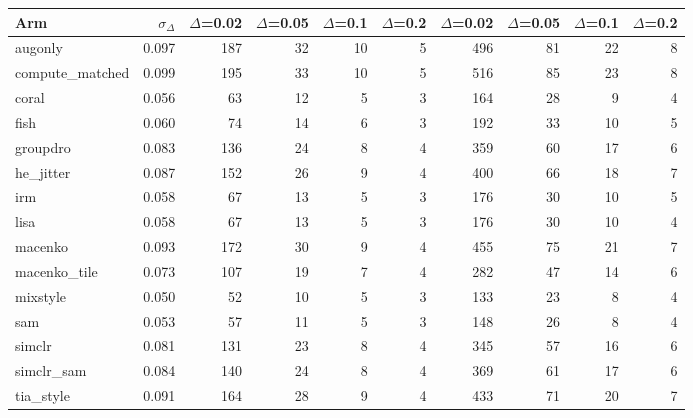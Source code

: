 \begin{tabular}{lrrrrrrrrr}
\toprule
Arm & $\sigma_\Delta$ & $\Delta$=0.02 & $\Delta$=0.05 & $\Delta$=0.1 & $\Delta$=0.2 & $\Delta$=0.02 & $\Delta$=0.05 & $\Delta$=0.1 & $\Delta$=0.2 \\
\midrule
augonly & 0.097 & 187 & 32 & 10 & 5 & 496 & 81 & 22 & 8 \\
compute\_matched & 0.099 & 195 & 33 & 10 & 5 & 516 & 85 & 23 & 8 \\
coral & 0.056 & 63 & 12 & 5 & 3 & 164 & 28 & 9 & 4 \\
fish & 0.060 & 74 & 14 & 6 & 3 & 192 & 33 & 10 & 5 \\
groupdro & 0.083 & 136 & 24 & 8 & 4 & 359 & 60 & 17 & 6 \\
he\_jitter & 0.087 & 152 & 26 & 9 & 4 & 400 & 66 & 18 & 7 \\
irm & 0.058 & 67 & 13 & 5 & 3 & 176 & 30 & 10 & 5 \\
lisa & 0.058 & 67 & 13 & 5 & 3 & 176 & 30 & 10 & 4 \\
macenko & 0.093 & 172 & 30 & 9 & 4 & 455 & 75 & 21 & 7 \\
macenko\_tile & 0.073 & 107 & 19 & 7 & 4 & 282 & 47 & 14 & 6 \\
mixstyle & 0.050 & 52 & 10 & 5 & 3 & 133 & 23 & 8 & 4 \\
sam & 0.053 & 57 & 11 & 5 & 3 & 148 & 26 & 8 & 4 \\
simclr & 0.081 & 131 & 23 & 8 & 4 & 345 & 57 & 16 & 6 \\
simclr\_sam & 0.084 & 140 & 24 & 8 & 4 & 369 & 61 & 17 & 6 \\
tia\_style & 0.091 & 164 & 28 & 9 & 4 & 433 & 71 & 20 & 7 \\
\bottomrule
\end{tabular}
